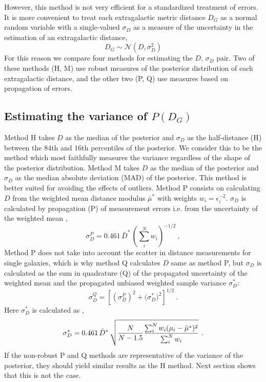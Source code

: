\documentclass[a4paper,fleqn,usenatbib]{mnras}
\begin{document}
However, this method is not very efficient for a standardized treatment of errors. It is more convenient to treat each extragalactic metric distance $D_G$ as a normal random variable with a single-valued $\sigma_D$ as a measure of the uncertainty in the estimation of an extragalactic distance,
\[D_G\sim \mathcal{N}(D,\sigma_D^2)\]
For this reason we compare four methods for estimating the $D,\,\sigma_D$ pair. Two of these methods (H, M) use robust measures of the posterior distribution of each extragalactic distance, and the other two (P, Q) use measures based on propagation of errors.

\subsection{Estimating the variance of $P(D_G)$}
\label{sec:meth} 

Method H takes $D$ as the median of the posterior and $\sigma_D$ as the half-distance (H) between the 84th and 16th percentiles of the posterior. We consider this to be the method which most faithfully measures the variance regardless of the shape of the posterior distribution. Method M takes $D$ as the median of the posterior and $\sigma_D$ as the median absolute deviation (MAD) of the posterior. This method is better suited for avoiding the effects of outliers. Method P consists on calculating $D$ from the weighted mean distance modulus $\bar{\mu}^*$ with weights $w_i=\epsilon_i^{-2}$. $\sigma_D$ is calculated by propagation (P) of measurement errors  i.e. from the uncertainty of the weighted mean \citep{cosmicflows},
\begin{equation}
\sigma_D^P=0.461\,\bar{D}^*\,\left(\sum_i^Nw_i\right)^{-1/2} \ ,
\end{equation}
Method P does not take into account the scatter in distance measurements for single galaxies, which is why method Q calculates $D$ same as method P, but $\sigma_D$ is calculated as the sum in quadrature (Q) of the propagated uncertainty of the weighted mean and the propagated unbiased weighted sample variance $\sigma_D^*$:
\begin{equation}
\sigma_D^Q=\left[ \left(\sigma_D^P\right)^2+\Big(\sigma_D^*\Big)^2\right]^{1/2} \ .
\end{equation}
Here $\sigma^*_D$ is calculated as  \citep{wstdev},
\begin{equation}
\sigma^*_D=0.461\,\bar{D}^*\,\sqrt{\frac{N}{N-1.5}\frac{\sum_i^Nw_i(\mu_i-\bar{\mu}^*)^2}{\sum_i^Nw_i}\vphantom{\Biggl(}}\ .
\end{equation}
If the non-robust P and Q methods are representative of the variance of the posterior, they should yield similar results as the H method. Next section shows that this is not the case.
\end{document}
